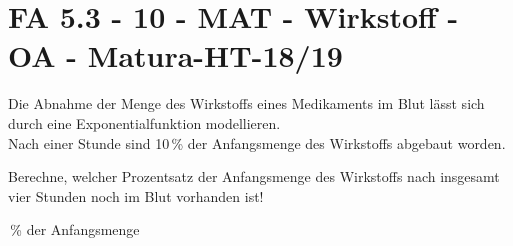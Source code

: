\section{FA 5.3 - 10 - MAT - Wirkstoff - OA - Matura-HT-18/19}

\begin{beispiel}[FA 5.3]{1}
Die Abnahme der Menge des Wirkstoffs eines Medikaments im Blut lässt sich durch eine Exponentialfunktion modellieren.\\
Nach einer Stunde sind 10\,\% der Anfangsmenge des Wirkstoffs abgebaut worden.

Berechne, welcher Prozentsatz der Anfangsmenge des Wirkstoffs nach insgesamt vier Stunden noch im Blut vorhanden ist!\leer

\,\% der Anfangsmenge
\end{beispiel}
